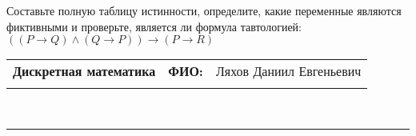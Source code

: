 \documentclass[10pt]{exam}
\newcommand{\class}{Дискретная математика}
\newcommand{\examdate}{}
\begin{document}
\begin{questions}
\begin{enumerate} [a)]
\end{enumerate}\question Составьте полную таблицу истинности, определите, какие переменные являются фиктивными и проверьте, является ли формула тавтологией:
$(( P \rightarrow Q) \land (Q \rightarrow P)) \rightarrow (P \rightarrow R)$

\end{questions}
\newpage
\begin{flushright}
\begin{tabular}{p{2.8in} r l}
\textbf{\class} & \textbf{ФИО:} &Ляхов Даниил Евгеньевич
\\

\textbf{\examdate} &&\\
\end{tabular}\\
\end{flushright}
\rule[1ex]{\textwidth}{.1pt}
\end{document}
